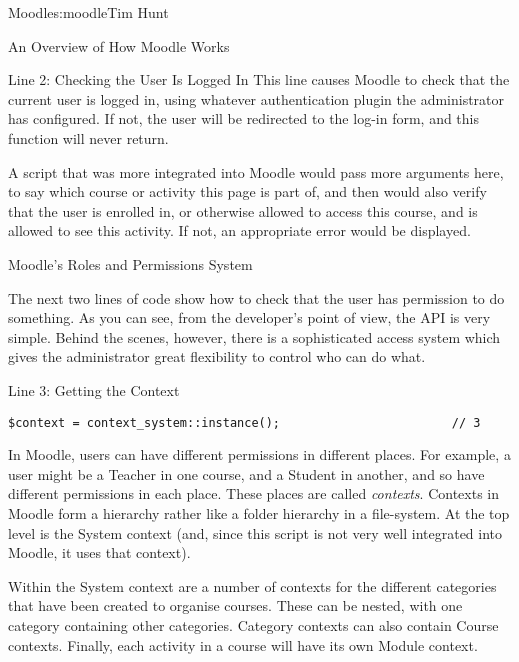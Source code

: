\begin{aosachapter}{Moodle}{s:moodle}{Tim Hunt}
\begin{aosasect1}{An Overview of How Moodle Works}
\begin{aosasect2}{Line 2: Checking the User Is Logged In}
This line causes Moodle to check that the current user is logged in,
using whatever authentication plugin the administrator has
configured. If not, the user will be redirected to the log-in form, and this
function will never return.

A script that was more integrated into Moodle
would pass more arguments here, to say which course or activity this
page is part of, and then  would also verify that
the user is enrolled in, or otherwise allowed to access this course,
and is allowed to see this activity. If not, an appropriate error
would be displayed.

\end{aosasect2}

\end{aosasect1}

\begin{aosasect1}{Moodle's Roles and Permissions System}

The next two lines of code show how to check that the user has
permission to do something. As you can see, from the developer's point
of view, the API is very simple. Behind the scenes, however, there is
a sophisticated access system which gives the administrator great
flexibility to control who can do what.

\begin{aosasect2}{Line 3: Getting the Context}

\begin{verbatim}
$context = context_system::instance();                        // 3
\end{verbatim}

In Moodle, users can have different permissions in different
places. For example, a user might be a Teacher in one course, and a
Student in another, and so have different permissions in each
place. These places are called \emph{contexts}. Contexts in Moodle form a
hierarchy rather like a folder hierarchy in a file-system. At the top
level is the System context (and, since this script is not very well
integrated into Moodle, it uses that context).

Within the System context are a number of contexts for the different
categories that have been created to organise courses. These can be
nested, with one category containing other categories. Category
contexts can also contain Course contexts. Finally, each activity in a
course will have its own Module context.



\end{aosasect2}
\end{aosasect1}
\end{aosachapter}
